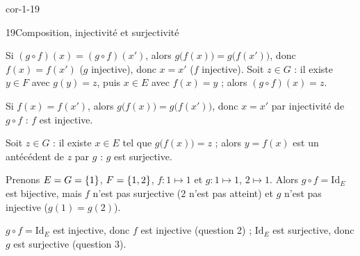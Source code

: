 \begin{blocLivre}{cor-1-19}
\begin{corrige}{19}{Composition, injectivité et surjectivité}
\begin{questions}
  \item {} Si $(g\circ f)(x)=(g\circ f)(x')$, alors
    $g\bigl(f(x)\bigr)=g\bigl(f(x')\bigr)$, donc $f(x)=f(x')$ ($g$ injective), donc $x=x'$
    ($f$ injective).\quad
     Soit $z\in G$ : il existe $y\in F$ avec $g(y)=z$, puis $x\in E$ avec
    $f(x)=y$ ; alors $(g\circ f)(x)=z$.
  \item Si $f(x)=f(x')$, alors $g\bigl(f(x)\bigr)=g\bigl(f(x')\bigr)$, donc $x=x'$ par injectivité de
    $g\circ f$ : $f$ est injective.
  \item Soit $z\in G$ : il existe $x\in E$ tel que $g\bigl(f(x)\bigr)=z$ ; alors $y=f(x)$ est un
    antécédent de $z$ par $g$ : $g$ est surjective.
  \item Prenons $E=G=\left\{1\right\}$, $F=\left\{1,2\right\}$, $f:1\mapsto1$ et $g:1\mapsto1$, $2\mapsto1$. Alors
    $g\circ f=\mathrm{Id}_{E}$ est bijective, mais $f$ n'est pas surjective ($2$ n'est pas atteint) et
    $g$ n'est pas injective ($g(1)=g(2)$).
  \item $g\circ f=\mathrm{Id}_E$ est injective, donc $f$ est injective (question 2) ; $\mathrm{Id}_E$
    est surjective, donc $g$ est surjective (question 3).
\end{questions}
\end{corrige}
\end{blocLivre}

